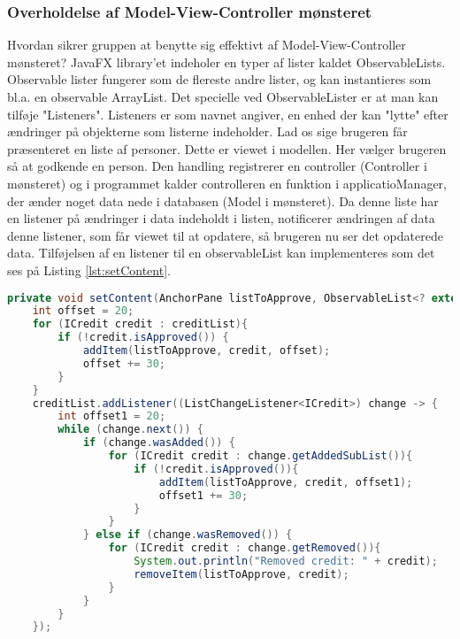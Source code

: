 \subsubsection{Overholdelse af Model-View-Controller mønsteret} Hvordan sikrer gruppen at benytte sig effektivt af Model-View-Controller mønsteret? 
JavaFX library'et indeholer en typer af lister kaldet ObservableLists. Observable lister fungerer som de flereste andre lister, og kan instantieres som bl.a. en observable ArrayList. Det specielle ved ObservableLister er at man kan tilføje "Listeners". Listeners er som navnet angiver, en enhed der kan "lytte" efter ændringer på objekterne som listerne indeholder. Lad os sige brugeren får præsenteret en liste af personer. Dette er viewet i modellen. Her vælger brugeren så at godkende en person. Den handling registrerer en controller (Controller i mønsteret) og i programmet kalder controlleren en funktion i applicatioManager, der ænder noget data nede i databasen (Model i mønsteret). Da denne liste har en listener på ændringer i data indeholdt i listen, notificerer ændringen af data denne listener, som får viewet til at opdatere, så brugeren nu ser det opdaterede data.
Tilføjelsen af en listener til en observableList kan implementeres som det ses på Listing \ref{lst:setContent}.


 


\begin{lstlisting}[language=Java, label=lst:setContent, caption = setContent]
private void setContent(AnchorPane listToApprove, ObservableList<? extends ICredit> creditList){
    int offset = 20;
    for (ICredit credit : creditList){
        if (!credit.isApproved()) {
            addItem(listToApprove, credit, offset);
            offset += 30;
        }
    }
    creditList.addListener((ListChangeListener<ICredit>) change -> {
        int offset1 = 20;
        while (change.next()) {
            if (change.wasAdded()) {
                for (ICredit credit : change.getAddedSubList()){
                    if (!credit.isApproved()){
                        addItem(listToApprove, credit, offset1);
                        offset1 += 30;
                    }
                }
            } else if (change.wasRemoved()) {
                for (ICredit credit : change.getRemoved()){
                    System.out.println("Removed credit: " + credit);
                    removeItem(listToApprove, credit);
                }
            }
        }
    });
\end{lstlisting}

